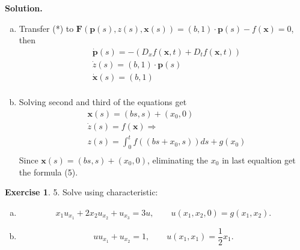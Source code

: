 \message{ !name(PDE-hw6-21935004-\unexpanded{谭焱}.tex)}\documentclass[a4paper]{book}
\newenvironment{solution}%
{\noindent\textbf{Solution.}}%
{\qedhere}
\numberwithin{equation}{chapter}
\theoremstyle{definition}
\newtheorem{exc}[exm]{Exercise}
\begin{document}
\begin{solution}
  \begin{enumerate}[(a)]
  \item Transfer (*) to $\mathbf{F}(\mathbf{p}(s),z(s),\mathbf{x}(s)) = (b,1)\cdot\mathbf{p}(s) - f(\mathbf{x}) = 0 $, then
    \begin{align*}
      &\dot{\mathbf{p}}(s) = - (D_x f(\mathbf{x},t) + D_t f(\mathbf{x},t)) \\
      &\dot{z}(s) = (b,1) \cdot \mathbf{p}(s) \\
      &\dot{\mathbf{x}}(s) = (b,1) \\
    \end{align*}

  \item Solving second and third of the equations get
    \begin{align*}
      &\mathbf{x}(s) = (bs,s) + (x_0,0) \\
      &\dot{z}(s) = f(\mathbf{x}) \Longrightarrow \\
      &z(s) = \int_0^t f((bs + x_0,s))ds + g(x_0) \\
    \end{align*}
    Since $\mathbf{x}(s) = (bs,s) + (x_0,0)$, eliminating the $x_0$ in last equaltion get the formula (5). 
  \end{enumerate}
\end{solution}

\begin{exc}
  5.  Solve using characteristic:
  \begin{enumerate} [(a)]
  \item
    \begin{equation}
      \label{eq:6:4:1}
      x_1 u_{x_1} + 2 x_2 u_{x_2} + u_{x_3} = 3u, \qquad u(x_1, x_2, 0) = g(x_1, x_2).
    \end{equation}

    \item
      \begin{equation}
        \label{eq:6:4:2}
        u u_{x_1} + u_{x_2} = 1, \qquad u(x_1, x_1) = \frac{1}{2} x_1.
      \end{equation}

  \end{enumerate}
\end{exc}
\end{document}
